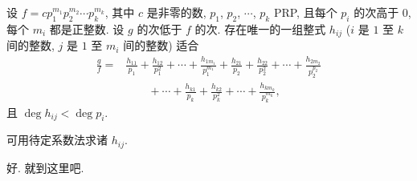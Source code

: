 \begin{proposition}
    设 $f = c p_1^{m_1} p_2^{m_2} \cdots p_k^{m_k}$, 其中 $c$ 是非零的数, $p_1$, $p_2$, $\cdots$, $p_k$ PRP, 且每个 $p_i$ 的次高于 $0$, 每个 $m_i$ 都是正整数. 设 $g$ 的次低于 $f$ 的次. 存在唯一的一组整式 $h_{ij}$ ($i$ 是 $1$ 至 $k$ 间的整数, $j$ 是 $1$ 至 $m_i$ 间的整数) 适合
    \begin{align*}
        \frac{g}{f}
        = {} & \frac{h_{11}}{p_1} + \frac{h_{12}}{p_1^2} + \cdots + \frac{h_{1 m_1}}{p_1^{m_1}} + \frac{h_{21}}{p_2} + \frac{h_{22}}{p_2^2} + \cdots + \frac{h_{2 m_2}}{p_2^{p_2}} \\
             & \qquad + \cdots + \frac{h_{k1}}{p_k} + \frac{h_{k2}}{p_k^2} + \cdots + \frac{h_{k m_k}}{p_k^{m_k}},
    \end{align*}
    且 $\deg h_{ij} < \deg p_i$.
\end{proposition}

\begin{remark}
    可用待定系数法求诸 $h_{ij}$.
\end{remark}

好. 就到这里吧.
